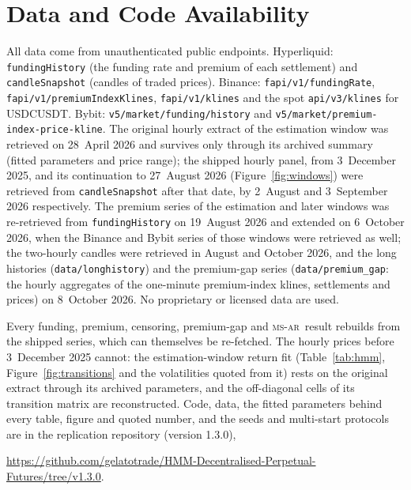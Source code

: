 \documentclass[10pt,a4paper]{article}
\newcommand{\MSAR}{\textsc{ms-ar}}
\begin{document}
\section*{Data and Code Availability}

\begin{sloppypar}
All data come from unauthenticated public endpoints. Hyperliquid: \texttt{fundingHistory} (the funding rate and premium of each settlement) and \texttt{candleSnapshot} (candles of traded prices). Binance: \texttt{fapi/v1/fundingRate}, \texttt{fapi/v1/premiumIndexKlines}, \texttt{fapi/v1/klines} and the spot \texttt{api/v3/klines} for USDCUSDT. Bybit: \texttt{v5/market/funding/history} and \texttt{v5/market/premium-index-price-kline}. The original hourly extract of the estimation window was retrieved on 28~April 2026 and survives only through its archived summary (fitted parameters and price range); the shipped hourly panel, from 3~December 2025, and its continuation to 27~August 2026 (Figure~\ref{fig:windows}) were retrieved from \texttt{candleSnapshot} after that date, by 2~August and 3~September 2026 respectively. The premium series of the estimation and later windows was re-retrieved from \texttt{fundingHistory} on 19~August 2026 and extended on 6~October 2026, when the Binance and Bybit series of those windows were retrieved as well; the two-hourly candles were retrieved in August and October 2026, and the long histories (\texttt{data/longhistory}) and the premium-gap series (\texttt{data/premium\_gap}: the hourly aggregates of the one-minute premium-index klines, settlements and prices) on 8~October 2026. No proprietary or licensed data are used.
\end{sloppypar}

Every funding, premium, censoring, premium-gap and \MSAR\ result rebuilds from the shipped series, which can themselves be re-fetched. The hourly prices before 3~December 2025 cannot: the estimation-window return fit (Table~\ref{tab:hmm}, Figure~\ref{fig:transitions} and the volatilities quoted from it) rests on the original extract through its archived parameters, and the off-diagonal cells of its transition matrix are reconstructed. Code, data, the fitted parameters behind every table, figure and quoted number, and the seeds and multi-start protocols are in the replication repository (version 1.3.0),
\begin{center}\url{https://github.com/gelatotrade/HMM-Decentralised-Perpetual-Futures/tree/v1.3.0}.\end{center}
\end{document}

